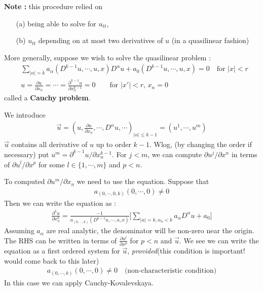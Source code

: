 \documentclass[10pt,a4paper]{report}
\begin{document}
\textbf{Note :} this procedure relied on 
\begin{itemize}
\item[(a)] being able to solve for $u_{tt}$,
\item[(b)] $u_{tt}$ depending on at most two derivatives of $u$ (in a quasilinear fashion)
\end{itemize}
\s

\quad More generally, suppose we wish to solve the quasilinear problem :
\begin{align*}
& \sum_{|\alpha|=k} a_{\alpha} (D^{k-1}u,\cdots, u, x) D^{\alpha}u + a_0 (D^{k-1}u, \cdots, u,x) = 0 \quad \text{for } |x|<r \\
&  u = \frac{\partial u}{\partial x_n} =  \cdots = \frac{\partial^{k-1} u}{\partial x_n^{k-1}} = 0 \quad \quad \text{for } |x'| <r,\, x_n=0
\end{align*}
called a \textbf{Cauchy problem}.

\quad We introduce
\begin{align*}
\vec{u} = (u,\frac{\partial u}{\partial x_n}, \cdots, D^{\alpha}u,\cdots )_{|\alpha|\leq k-1} = (u^1,\cdots, u^m)
\end{align*}
$\vec{u}$ contains all derivative of $u$ up to order $k-1$. Wlog, (by changing the order if necessary) put $u^m = \partial^{k-1} u / \partial x_n^{k-1}$. For $j<m$, we can compute $\partial u^j / \partial x^n$ in terms of $\partial u^l /\partial x^p$ for some $l\in \{1,\cdots, m\}$ and $p<n$.

\quad To computed $\partial u^m / \partial x_n$ we need to use the equation. Suppose that
\begin{align*}
a_{(0,\cdots,0,k)}(0,\cdots, 0) \neq 0
\end{align*}
Then we can write the equation as :
\begin{align*}
\frac{\partial^k u}{\partial x^k_n} = \frac{-1}{a_{(0,\cdots,k)} (D^{k-1}u,\cdots,u,x)}\Big[\sum_{|\alpha|=k, \alpha_n <k} a_{\alpha} D^{\alpha} u + a_0  \Big]
\end{align*}
Assuming $a_{\alpha}$ are real analytic, the denominator will be non-zero near the origin. The RHS can be written in terms of $\frac{\partial u^l}{\partial x^p}$ for $p<n$ and $\vec{u}$. We see we can write the equation as a first ordered system for $\vec{u}$, \emph{provided}(this condition is important! would come back to this later)
\begin{align*}
a_{(0,\cdots, k)}(0,\cdots, 0) \neq 0 \quad \text{(non-characteristic condition)}
\end{align*}
In this case we can apply Cauchy-Kovalevskaya.
\s
\end{document}
